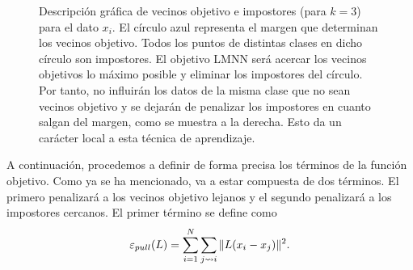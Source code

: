 \begin{figure}[h]
    \centering
    \begin{subfigure}{.5\textwidth}
        \centering
    \end{subfigure}%
    \begin{subfigure}{.5\textwidth}
        \centering
    \end{subfigure}
    \caption{Descripción gráfica de vecinos objetivo e impostores (para $k = 3$) para el dato $x_i$. El círculo azul representa el margen que determinan los vecinos objetivo. Todos los puntos de distintas clases en dicho círculo son impostores. El objetivo LMNN será acercar los vecinos objetivos lo máximo posible y eliminar los impostores del círculo. Por tanto, no influirán los datos de la misma clase que no sean vecinos objetivo y se dejarán de penalizar los impostores en cuanto salgan del margen, como se muestra a la derecha. Esto da un carácter local a esta técnica de aprendizaje.} \label{fig:targets_impostors}
\end{figure}

A continuación, procedemos a definir de forma precisa los términos de la función objetivo. Como ya se ha mencionado, va a estar compuesta de dos términos. El primero penalizará a los vecinos objetivo lejanos y el segundo penalizará a los impostores cercanos. El primer término se define como
\[ \varepsilon_{pull}(L) = \sum_{i=1}^N \sum_{j\rightsquigarrow i} \|L(x_i-x_j)\|^2. \]

